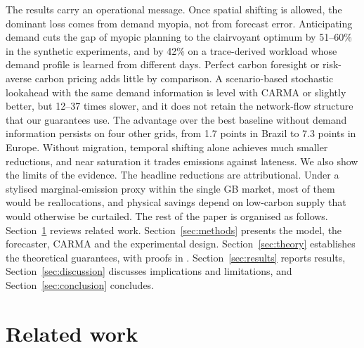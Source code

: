 The results carry an operational message. Once spatial shifting is allowed, the dominant loss comes from demand myopia, not from forecast error. Anticipating demand cuts the gap of myopic planning to the clairvoyant optimum by 51--60\% in the synthetic experiments, and by 42\% on a trace-derived workload whose demand profile is learned from different days. Perfect carbon foresight or risk-averse carbon pricing adds little by comparison. A scenario-based stochastic lookahead with the same demand information is level with CARMA or slightly better, but 12--37 times slower, and it does not retain the network-flow structure that our guarantees use. The advantage over the best baseline without demand information persists on four other grids, from 1.7 points in Brazil to 7.3 points in Europe. Without migration, temporal shifting alone achieves much smaller reductions, and near saturation it trades emissions against lateness. We also show the limits of the evidence. The headline reductions are attributional. Under a stylised marginal-emission proxy within the single GB market, most of them would be reallocations, and physical savings depend on low-carbon supply that would otherwise be curtailed. The rest of the paper is organised as follows. Section~\ref{sec:related} reviews related work. Section~\ref{sec:methods} presents the model, the forecaster, CARMA and the experimental design. Section~\ref{sec:theory} establishes the theoretical guarantees, with proofs in . Section~\ref{sec:results} reports results, Section~\ref{sec:discussion} discusses implications and limitations, and Section~\ref{sec:conclusion} concludes.

\section{Related work}\label{sec:related}

